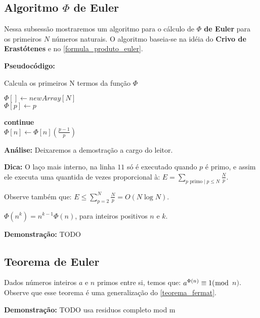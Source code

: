 \subsection{Algoritmo $\Phi$ de Euler}

Nessa subsessão mostraremos um algoritmo para o cálculo de \textbf{$\Phi$ de Euler} para os primeiros $N$ números naturais.
O algoritmo baseia-se na idéia do \textbf{Crivo de Erastótenes} e no \autoref{formula_produto_euler}.
\newline

\textbf{Pseudocódigo:}
\begin{algorithm}
\caption{Calcula os primeiros N termos da função $\Phi$}
\begin{algorithmic}[1]
\State $\Phi[] \gets new Array[N]$
\\
\State $\Phi[p] \gets p$
\EndFor
\\

 
\State \textbf{continue}
\EndIf
\\
\State $\Phi[n] \gets \Phi[n] (\frac{p-1}{p})$
\EndFor
\EndFor
\\
\State \Return {$\Phi[]$}
\EndProcedure
\end{algorithmic}
\end{algorithm}

\textbf{Análise:}
Deixaremos a demostração a cargo do leitor.

\textbf{Dica:}
O laço mais interno, na linha $11$ só é executado quando $p$ é primo, e assim ele executa uma quantida de vezes proporcional à:
$E = \sum_{p\text{ primo} \mid p \leq N}\frac{N}{p} $.

Observe também que: $E \leq \sum_{p=2}^{N}\frac{N}{p} = O(N\log N)$. 


\begin{proposition}\label{phi_potencia_nk}
$\Phi(n^k) = n^{k-1}\Phi(n)$, para inteiros positivos $n$ e $k$. 
\end{proposition}
\textbf{Demonstração:}
TODO


\subsection{Teorema de Euler}

\begin{theorem}\label{teorema_de_euler}
Dados números inteiros $a$ e $n$ primos entre si, temos que:
$a^{\Phi(n)} \equiv 1 (\bmod$ $n)$. Observe que esse teorema é uma generalização do \autoref{teorema_fermat}.
\end{theorem}
\textbf{Demonstração:}
TODO usa residuos completo mod m



